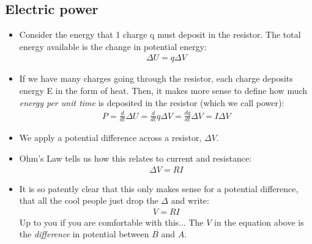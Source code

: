 \documentclass[aspectratio=169,
hyperref={colorlinks,urlcolor=blue}
]{beamer}
\begin{document}
\subsection{Electric power}
\label{subsec:electricpower}
{
\begin{itemize}
\item Consider the energy that 1 charge q must deposit in the resistor. The total energy available is the change in potential energy:
\begin{align*}
\Delta U = q \Delta V
\end{align*}
\item If we have many charges going through the resistor, each charge deposits energy E in the form of heat. Then, it makes more sense to define how much
\textit{energy per unit time} is deposited in the resistor (which we call power):
\begin{align*}
P=\frac{d}{dt}\Delta U=\frac{d}{dt}q\Delta V = \frac{dq}{dt}\Delta V = I\Delta V
\end{align*}
\end{itemize}
}
{}



{
\vspace{-0.25cm}
\begin{itemize}
\item We apply a potential difference across a resistor, $\Delta V$.
\item Ohm’s Law tells us how this relates to current and resistance:
\begin{align*}
\Delta V = RI
\end{align*}
\item It is so patently clear that this only makes sense for a potential difference, that all the cool people just drop the $\Delta$ and write:
\begin{align*}
V = RI
\end{align*}
Up to you if you are comfortable with this... The $V$ in the equation above is the \textit{difference} in potential between $B$ and $A$. 
\end{itemize}
}
{}
\end{document}

